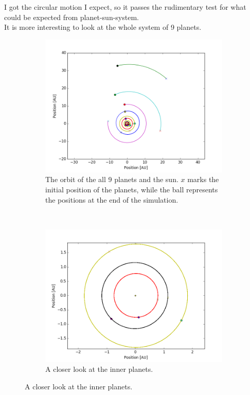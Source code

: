 \documentclass[a4paper, 10pt]{article}
\begin{document}
I got the circular motion I expect, so it passes the rudimentary test for what could be expected from planet-sun-system. \\ 

It is more interesting to look at the whole system of 9 planets.

\begin{figure}[H]
\centering
\begin{subfigure}[t]{0.5\textwidth}
\centering
\includegraphics[width=\textwidth]{part2fullSystem.png}
\caption{The orbit of the all 9 planets and the sun. $x$ marks the initial position of the planets, while the ball represents the positions at the end of the simulation.}
\end{subfigure}%
~
\begin{subfigure}[t]{0.5\textwidth}
\centering
\includegraphics[width=\textwidth]{part2innerPlanets.png}
\caption{A closer look at the inner planets.}
\end{subfigure}%
\end{figure}
\end{document}
